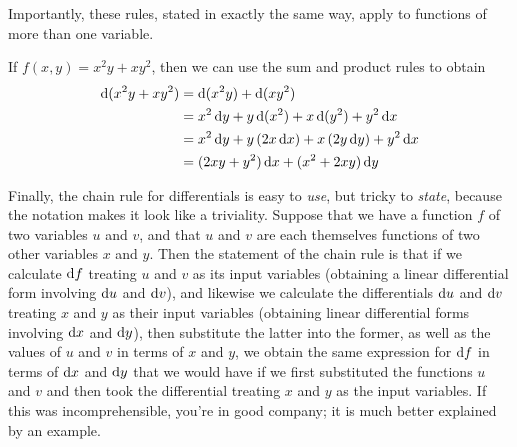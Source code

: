 \documentclass[12pt]{amsart}
\begin{document}
Importantly, these rules, stated in exactly the same way, apply to functions of more than one variable.
\begin{eg}\label{eg:twovar-differential}
  If $f(x,y) = x^2y + xy^2$, then we can use the sum and product rules to obtain
  \begin{align*}
    \mathrm{d}(x^2y + xy^2) &= \mathrm{d}(x^2y) + \mathrm{d}(xy^2)\\
    &= x^2\,\mathrm{d} y + y \,\mathrm{d}(x^2) + x \,\mathrm{d}(y^2) + y^2\,\mathrm{d} x\\
    &= x^2\,\mathrm{d} y + y \,(2x\,\mathrm{d} x) + x\, (2y\,\mathrm{d} y) + y^2\,\mathrm{d} x\\
    &= (2xy + y^2)\,\mathrm{d} x + (x^2+2xy)\,\mathrm{d} y
  \end{align*}
\end{eg}

Finally, the chain rule for differentials is easy to \emph{use}, but tricky to \emph{state}, because the notation makes it look like a triviality.
Suppose that we have a function $f$ of two variables $u$ and $v$, and that $u$ and $v$ are each themselves functions of two other variables $x$ and $y$.
Then the statement of the chain rule is that if we calculate $\mathrm{d} f$ treating $u$ and $v$ as its input variables (obtaining a linear differential form involving $\mathrm{d} u$ and $\mathrm{d} v$), and likewise we calculate the differentials $\mathrm{d} u$ and $\mathrm{d} v$ treating $x$ and $y$ as their input variables (obtaining linear differential forms involving $\mathrm{d} x$ and $\mathrm{d} y$), then substitute the latter into the former, as well as the values of $u$ and $v$ in terms of $x$ and $y$, we obtain the same expression for $\mathrm{d} f$ in terms of $\mathrm{d} x$ and $\mathrm{d} y$ that we would have if we first substituted the functions $u$ and $v$ and then took the differential treating $x$ and $y$ as the input variables.
If this was incomprehensible, you're in good company; it is much better explained by an example.
\end{document}
